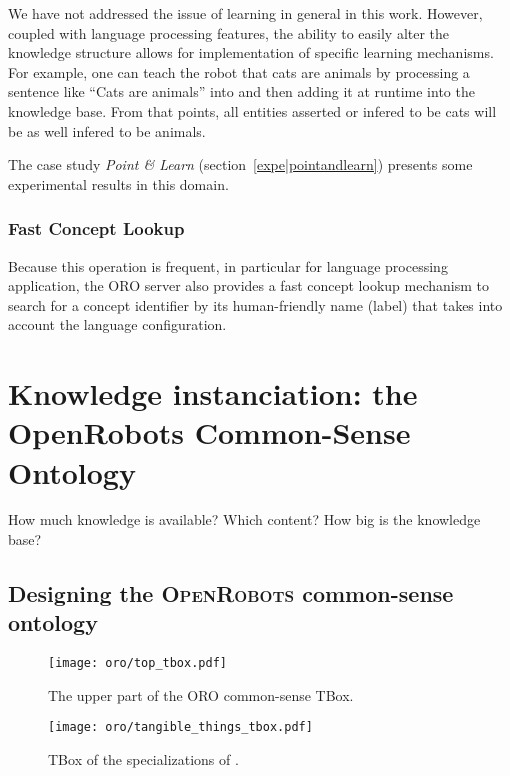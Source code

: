 We have not addressed the issue of learning in general in this work. However,
coupled with language processing features, the ability to easily alter the
knowledge structure allows for implementation of specific learning mechanisms.
For example, one can teach the robot that cats are animals by processing a
sentence like ``Cats are animals'' into  and then
adding it at runtime into the knowledge base. From that points, all entities
asserted or infered to be cats will be as well infered to be animals.

The case study \emph{Point \& Learn} (section~\ref{expe|pointandlearn})
presents some experimental results in this domain.

\subsubsection{Fast Concept Lookup}
\label{sect|oroserver-lookup}

Because this operation is frequent, in particular for language processing
application, the ORO server also provides a fast concept lookup mechanism to
search for a concept identifier by its human-friendly name (label) that takes
into account the language configuration.


\section{Knowledge instanciation: the OpenRobots Common-Sense Ontology}

How much knowledge is available? Which content? How big is the knowledge base?

\subsection{Designing the \textsc{OpenRobots} common-sense ontology}
\label{sect|commonsense-design}

\begin{figure}
    \centering
    \texttt{[image: oro/top\_tbox.pdf]}
    \caption{The upper part of the ORO common-sense TBox.}
    \label{fig|upper_tbox}
\end{figure}

\begin{figure}
    \centering
    \texttt{[image: oro/tangible\_things\_tbox.pdf]}
    \caption{TBox of the specializations of .}
    \label{fig|tangible_things_tbox}
\end{figure}


